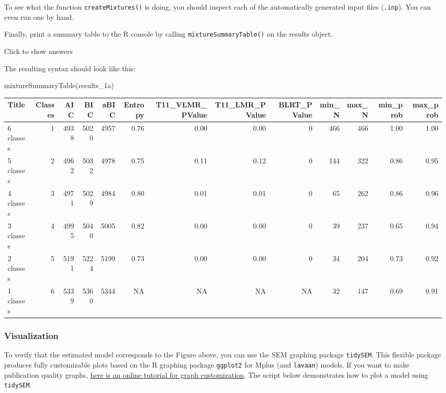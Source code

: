 \documentclass[
]{book}
\newenvironment{Shaded}{\begin{snugshade}}{\end{snugshade}}
\newcommand{\FunctionTok}[1]{\textcolor[rgb]{0.00,0.00,0.00}{#1}}
\newcommand{\NormalTok}[1]{#1}
\begin{document}
To see what the function \texttt{createMixtures()} is doing, you should inspect each of the automatically generated input files (\texttt{.inp}). You can even run one by hand.

Finally, print a summary table to the R console by calling \texttt{mixtureSummaryTable()} on the results object.

Click to show answers

The resulting syntax should look like this:

\begin{Shaded}
\begin{Highlighting}[]
\FunctionTok{mixtureSummaryTable}\NormalTok{(results\_1a)}
\end{Highlighting}
\end{Shaded}

\begin{tabular}[t]{l|r|r|r|r|r|r|r|r|r|r|r|r}
\hline
Title & Classes & AIC & BIC & aBIC & Entropy & T11\_VLMR\_PValue & T11\_LMR\_PValue & BLRT\_PValue & min\_N & max\_N & min\_prob & max\_prob\\
\hline
6 classes & 1 & 4938 & 5020 & 4957 & 0.76 & 0.00 & 0.00 & 0 & 466 & 466 & 1.00 & 1.00\\
\hline
5 classes & 2 & 4962 & 5032 & 4978 & 0.75 & 0.11 & 0.12 & 0 & 144 & 322 & 0.86 & 0.95\\
\hline
4 classes & 3 & 4971 & 5029 & 4984 & 0.80 & 0.01 & 0.01 & 0 & 65 & 262 & 0.86 & 0.96\\
\hline
3 classes & 4 & 4995 & 5040 & 5005 & 0.82 & 0.00 & 0.00 & 0 & 39 & 237 & 0.65 & 0.94\\
\hline
2 classes & 5 & 5191 & 5224 & 5199 & 0.73 & 0.00 & 0.00 & 0 & 34 & 204 & 0.73 & 0.92\\
\hline
1 classes & 6 & 5339 & 5360 & 5344 & NA & NA & NA & NA & 32 & 147 & 0.69 & 0.91\\
\hline
\end{tabular}

\hypertarget{visualization-1}{%
\subsubsection{Visualization}\label{visualization-1}}

To verify that the estimated model corresponds to the Figure above, you can use the SEM graphing package \texttt{tidySEM}.
This flexible package produces fully customizable plots based on the R graphing package \texttt{ggplot2} for Mplus (and \texttt{lavaan}) models.
If you want to make publication quality graphs, \href{https://cjvanlissa.github.io/tidySEM/articles/Plotting_graphs.html}{here is an online tutorial for graph customization}.
The script below demonstrates how to plot a model using \texttt{tidySEM}.
\end{document}
